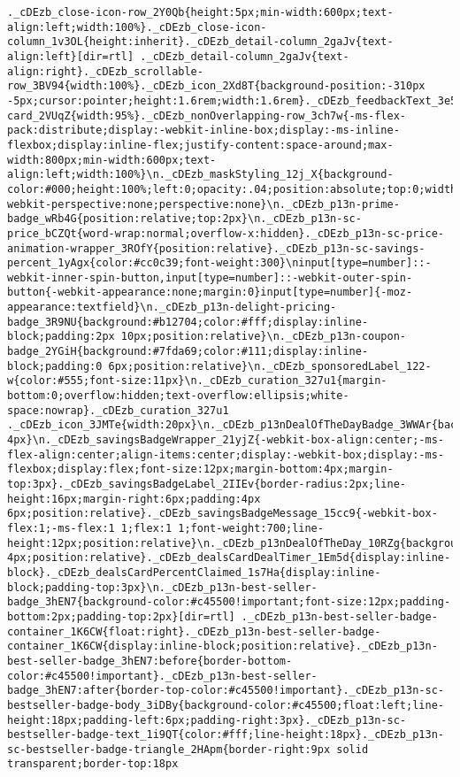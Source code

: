 \documentclass[
]{article}
\begin{document}
\begin{verbatim}
._cDEzb_close-icon-row_2Y0Qb{height:5px;min-width:600px;text-align:left;width:100%}._cDEzb_close-icon-column_1v3OL{height:inherit}._cDEzb_detail-column_2gaJv{text-align:left}[dir=rtl] ._cDEzb_detail-column_2gaJv{text-align:right}._cDEzb_scrollable-row_3BV94{width:100%}._cDEzb_icon_2Xd8T{background-position:-310px -5px;cursor:pointer;height:1.6rem;width:1.6rem}._cDEzb_feedbackText_3e5Du{cursor:pointer}._cDEzb_nonOverlapping-card_2VUqZ{width:95%}._cDEzb_nonOverlapping-row_3ch7w{-ms-flex-pack:distribute;display:-webkit-inline-box;display:-ms-inline-flexbox;display:inline-flex;justify-content:space-around;max-width:800px;min-width:600px;text-align:left;width:100%}\n._cDEzb_maskStyling_12j_X{background-color:#000;height:100%;left:0;opacity:.04;position:absolute;top:0;width:100%}._cDEzb_positionRelativeCss_1GDAD{padding:6px;position:relative}._cDEzb_noop_1oBjC{-webkit-perspective:none;perspective:none}\n._cDEzb_p13n-prime-badge_wRb4G{position:relative;top:2px}\n._cDEzb_p13n-sc-price_bCZQt{word-wrap:normal;overflow-x:hidden}._cDEzb_p13n-sc-price-animation-wrapper_3ROfY{position:relative}._cDEzb_p13n-sc-savings-percent_1yAgx{color:#cc0c39;font-weight:300}\ninput[type=number]::-webkit-inner-spin-button,input[type=number]::-webkit-outer-spin-button{-webkit-appearance:none;margin:0}input[type=number]{-moz-appearance:textfield}\n._cDEzb_p13n-delight-pricing-badge_3R9NU{background:#b12704;color:#fff;display:inline-block;padding:2px 10px;position:relative}\n._cDEzb_p13n-coupon-badge_2YGiH{background:#7fda69;color:#111;display:inline-block;padding:0 6px;position:relative}\n._cDEzb_sponsoredLabel_122-w{color:#555;font-size:11px}\n._cDEzb_curation_327u1{margin-bottom:0;overflow:hidden;text-overflow:ellipsis;white-space:nowrap}._cDEzb_curation_327u1 ._cDEzb_icon_3JMTe{width:20px}\n._cDEzb_p13nDealOfTheDayBadge_3WWAr{background:#b12704;color:#fff;padding:2px 4px}\n._cDEzb_savingsBadgeWrapper_21yjZ{-webkit-box-align:center;-ms-flex-align:center;align-items:center;display:-webkit-box;display:-ms-flexbox;display:flex;font-size:12px;margin-bottom:4px;margin-top:3px}._cDEzb_savingsBadgeLabel_2IIEv{border-radius:2px;line-height:16px;margin-right:6px;padding:4px 6px;position:relative}._cDEzb_savingsBadgeMessage_15cc9{-webkit-box-flex:1;-ms-flex:1 1;flex:1 1;font-weight:700;line-height:12px;position:relative}\n._cDEzb_p13nDealOfTheDay_10RZg{background:#b12704;color:#fff;float:right;padding:2px 4px;position:relative}._cDEzb_dealsCardDealTimer_1Em5d{display:inline-block}._cDEzb_dealsCardPercentClaimed_1s7Ha{display:inline-block;padding-top:3px}\n._cDEzb_p13n-best-seller-badge_3hEN7{background-color:#c45500!important;font-size:12px;padding-bottom:2px;padding-top:2px}[dir=rtl] ._cDEzb_p13n-best-seller-badge-container_1K6CW{float:right}._cDEzb_p13n-best-seller-badge-container_1K6CW{display:inline-block;position:relative}._cDEzb_p13n-best-seller-badge_3hEN7:before{border-bottom-color:#c45500!important}._cDEzb_p13n-best-seller-badge_3hEN7:after{border-top-color:#c45500!important}._cDEzb_p13n-sc-bestseller-badge-body_3iDBy{background-color:#c45500;float:left;line-height:18px;padding-left:6px;padding-right:3px}._cDEzb_p13n-sc-bestseller-badge-text_1i9QT{color:#fff;line-height:18px}._cDEzb_p13n-sc-bestseller-badge-triangle_2HApm{border-right:9px solid transparent;border-top:18px 
\end{verbatim}
\end{document}
